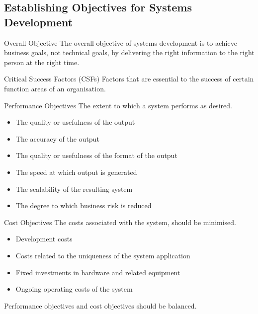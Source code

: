 \documentclass[\main/notes.tex]{subfiles}
\begin{document}
			\subsection{Establishing Objectives for Systems Development}
				\begin{sidenote}{Overall Objective}
					The overall objective of systems development is to achieve business goals, not technical goals, by delivering the right information to the right person at the right time.
				\end{sidenote}
				\begin{definition}{Critical Success Factors (CSFs)}
					Factors that are essential to the success of certain function areas of an organisation.
				\end{definition}
				\begin{definition}{Performance Objectives}
					The extent to which a system performs as desired.
					\begin{multicols}{2}
						\begin{itemize}[nosep]
							\item The quality or usefulness of the output
							\item The accuracy of the output
							\item The quality or usefulness of the format of the output
							\item The speed at which output is generated
							\item The scalability of the resulting system
							\item The degree to which business risk is reduced
						\end{itemize}
					\end{multicols}
				\end{definition}
				\begin{definition}{Cost Objectives}
					The costs associated with the system, should be minimised.
					\begin{multicols}{2}
						\begin{itemize}[nosep]
							\item Development costs
							\item Costs related to the uniqueness of the system application
							\item Fixed investments in hardware and related equipment
							\item Ongoing operating costs of the system
						\end{itemize}
					\end{multicols}
				\end{definition}
				Performance objectives and cost objectives should be balanced.
\end{document}
